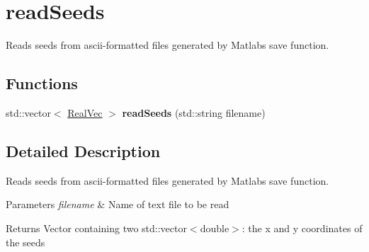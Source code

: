 \hypertarget{group__readSeeds}{}\section{read\+Seeds}
\label{group__readSeeds}


Reads seeds from ascii-\/formatted files generated by Matlab\textquotesingle{}s \textquotesingle{}save\textquotesingle{} function.  


\subsection*{Functions}
\begin{DoxyCompactItemize}
\item 
\mbox{\label{group__readSeeds_gad85b04f26adf16a2034600271b5cbcb3}} 
std\+::vector$<$ \mbox{\hyperlink{typedefs_8cpp_a84b6d9a0fbb45e01ad4a3aa5667f2992}{Real\+Vec}} $>$ {\bfseries read\+Seeds} (std\+::string filename)
\end{DoxyCompactItemize}


\subsection{Detailed Description}
Reads seeds from ascii-\/formatted files generated by Matlab\textquotesingle{}s \textquotesingle{}save\textquotesingle{} function. 


\begin{DoxyParams}{Parameters}
{\em filename} & Name of text file to be read \\
\hline
\end{DoxyParams}
\begin{DoxyReturn}{Returns}
Vector containing two std\+::vector$<$double$>$\+: the x and y coordinates of the seeds 
\end{DoxyReturn}

